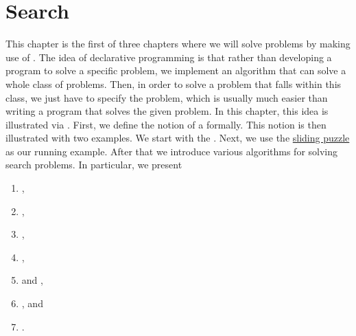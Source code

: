 \chapter{Search}
This chapter is the first of three chapters where we will solve problems by making use of
. 
The idea of declarative programming is that rather than developing a program to solve a specific problem,
we implement an algorithm that can solve a whole class of problems.  Then, in order to solve a problem that
falls within this class, we just have to specify the problem, which is usually much easier than writing a
program that solves the given problem.  In this chapter, this idea is illustrated via .
First, we define the notion of a  formally.  This notion is then illustrated with two
examples.  We start with the .  Next, we use the 
\href{https://en.wikipedia.org/wiki/15_puzzle}{sliding puzzle} as our running example. 
After that we introduce various algorithms for solving search problems.  In particular, we present
\begin{enumerate}
\item {},
\item {},
\item {},
\item {},
\item {} and ,
\item {}, and
\item {}.
\end{enumerate}


